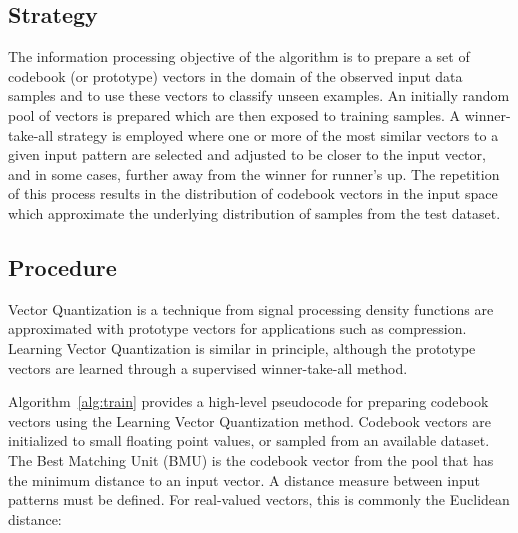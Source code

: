 \subsection{Strategy}
The information processing objective of the algorithm is to prepare a set of codebook (or prototype) vectors in the domain of the observed input data samples and to use these vectors to classify unseen examples.
An initially random pool of vectors is prepared which are then exposed to training samples. A winner-take-all strategy is employed where one or more of the most similar vectors to a given input pattern are selected and adjusted to be closer to the input vector, and in some cases, further away from the winner for runner's up. The repetition of this process results in the distribution of codebook vectors in the input space which approximate the underlying distribution of samples from the test dataset.

\subsection{Procedure}
Vector Quantization is a technique from signal processing density functions are approximated with prototype vectors for applications such as compression. Learning Vector Quantization is similar in principle, although the prototype vectors are learned through a supervised winner-take-all method.

Algorithm~\ref{alg:train} provides a high-level pseudocode for preparing codebook vectors using the Learning Vector Quantization method. 
Codebook vectors are initialized to small floating point values, or sampled from an available dataset. The Best Matching Unit (BMU) is the codebook vector from the pool that has the minimum distance to an input vector. A distance measure between input patterns must be defined. For real-valued vectors, this is commonly the Euclidean distance:

